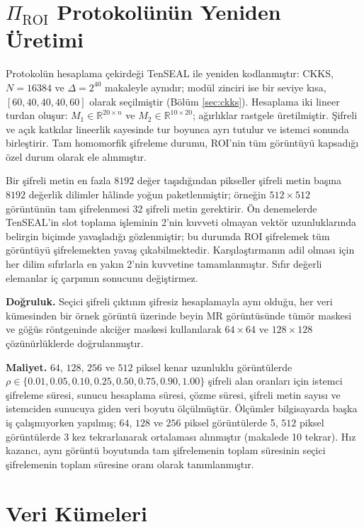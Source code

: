 \section{$\Pi_{\mathrm{ROI}}$ Protokolünün Yeniden Üretimi}\label{sec:reproduction}

Protokolün hesaplama çekirdeği TenSEAL \cite{benaissa2021tenseal} ile yeniden kodlanmıştır: CKKS, $N = 16384$ ve $\Delta = 2^{40}$ makaleyle aynıdır; modül zinciri ise bir seviye kısa, $[60, 40, 40, 40, 60]$ olarak seçilmiştir (Bölüm \ref{sec:ckks}). Hesaplama iki lineer turdan oluşur: $M_1 \in \mathbb{R}^{20 \times n}$ ve $M_2 \in \mathbb{R}^{10 \times 20}$; ağırlıklar rastgele üretilmiştir. Şifreli ve açık katkılar lineerlik sayesinde tur boyunca ayrı tutulur ve istemci sonunda birleştirir. Tam homomorfik şifreleme durumu, ROI'nin tüm görüntüyü kapsadığı özel durum olarak ele alınmıştır.

Bir şifreli metin en fazla $8192$ değer taşıdığından pikseller şifreli metin başına $8192$ değerlik dilimler hâlinde yoğun paketlenmiştir; örneğin $512 \times 512$ görüntünün tam şifrelenmesi 32 şifreli metin gerektirir. Ön denemelerde TenSEAL'in slot toplama işleminin 2'nin kuvveti olmayan vektör uzunluklarında belirgin biçimde yavaşladığı gözlenmiştir; bu durumda ROI şifrelemek tüm görüntüyü şifrelemekten yavaş çıkabilmektedir. Karşılaştırmanın adil olması için her dilim sıfırlarla en yakın 2'nin kuvvetine tamamlanmıştır. Sıfır değerli elemanlar iç çarpımın sonucunu değiştirmez.

\textbf{Doğruluk.} Seçici şifreli çıktının şifresiz hesaplamayla aynı olduğu, her veri kümesinden bir örnek görüntü üzerinde beyin MR görüntüsünde tümör maskesi ve göğüs röntgeninde akciğer maskesi kullanılarak $64 \times 64$ ve $128 \times 128$ çözünürlüklerde doğrulanmıştır.

\textbf{Maliyet.} $64$, $128$, $256$ ve $512$ piksel kenar uzunluklu görüntülerde $\rho \in \{0.01, 0.05, 0.10, 0.25, 0.50, 0.75, 0.90, 1.00\}$ şifreli alan oranları için istemci şifreleme süresi, sunucu hesaplama süresi, çözme süresi, şifreli metin sayısı ve istemciden sunucuya giden veri boyutu ölçülmüştür. Ölçümler bilgisayarda başka iş çalışmıyorken yapılmış; $64$, $128$ ve $256$ piksel görüntülerde 5, $512$ piksel görüntülerde 3 kez tekrarlanarak ortalaması alınmıştır (makalede 10 tekrar). Hız kazancı, aynı görüntü boyutunda tam şifrelemenin toplam süresinin seçici şifrelemenin toplam süresine oranı olarak tanımlanmıştır.

\section{Veri Kümeleri}\label{sec:data}

